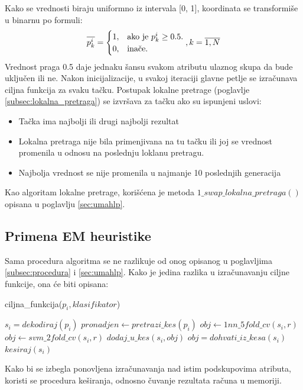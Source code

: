 \documentclass[a4paper]{article}
\begin{document}
Kako se vrednosti biraju uniformno iz intervala [0, 1], koordinata se transformiše u binarnu po formuli:
\begin{equation}
\overline{p_k^i}=\begin{cases}
    $1$, & \text{ako je $p_k^i\geq0.5$} .\\
    $0$, & \text{inače}.
    \end{cases}, k=\overline{1, N}
\end{equation}
Vrednost praga 0.5 daje jednaku šansu svakom atributu ulaznog skupa da bude uključen ili ne.
Nakon inicijalizacije, u svakoj iteraciji glavne petlje se izračunava ciljna funkcija za svaku tačku. Postupak lokalne pretrage (poglavlje \ref{subsec:lokalna_pretraga}) se izvršava za tačku ako su ispunjeni uslovi: 
\begin{itemize}
    \item Tačka ima najbolji ili drugi najbolji rezultat
    \item Lokalna pretraga nije bila primenjivana na tu tačku ili joj se vrednost promenila u odnosu na poslednju loklanu pretragu.
    \item Najbolja vrednost se nije promenila u najmanje 10 poslednjih generacija
\end{itemize}
Kao algoritam lokalne pretrage, korišćena je metoda $1\_swap\_lokalna\_pretraga()$ opisana u poglavlju \ref{sec:umahlp}.

\subsection{Primena EM heuristike}
\label{subsec:primena}
Sama procedura algoritma se ne razlikuje od onog opisanog u poglavljima \ref{subsec:procedura} i \ref{sec:umahlp}. Kako je jedina razlika u izračunavanju ciljne funkcije, ona će biti opisana:
\begin{algorithm}[H]
\label{alg:elm}
\caption{ciljna\_funkcija($p_i, klasifikator$)}
\begin{algorithmic}[1]
\STATE $s_i = dekodiraj(p_i)$
\STATE $pronadjen \leftarrow pretrazi\_kes(p_i)$
\STATE $obj \leftarrow 1nn\_5fold\_cv(s_i, r)$
\ELSE 
\STATE $obj \leftarrow svm\_2fold\_cv(s_i, r)$
\ENDIF
\STATE $dodaj\_u\_kes(s_i, obj)$
\ELSE 
\STATE $obj = dohvati\_iz\_kesa(s_i)$
\STATE $kesiraj(s_i)$
\ENDIF
\end{algorithmic}
\end{algorithm}
Kako bi se izbegla ponovljena izračunavanja nad istim podskupovima atributa, koristi se procedura keširanja, odnosno čuvanje rezultata računa u memoriji.
\end{document}
